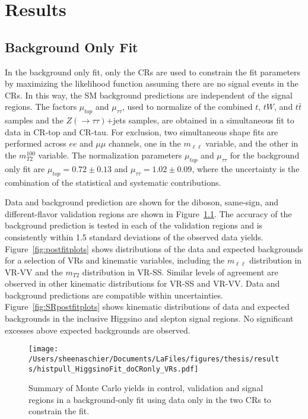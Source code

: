 \chapter{Results}
\label{ch:results}
\section{Background Only Fit}
In the background only fit, only the CRs are used to constrain the fit parameters by maximizing the likelihood function assuming there are no signal events in the CRs.  In this way, the SM background predictions are independent of the signal regions.  The factors $\mu_{top}$ and $\mu_{\tau\tau}$, used to normalize of the combined $t$, $tW$, and  $t\bar{t}$ samples and the  $Z(\rightarrow\tau\tau)$+jets samples, are obtained in a simultaneous fit to data in CR-top and CR-tau.  For exclusion, two simultaneous shape fits are performed across $ee$ and $\mu\mu$ channels, one in the $m_{\ell\ell}$ variable, and the other in the $m_{T2}^{100}$ variable.   The normalization parameters $\mu_{top}$ and $\mu_{\tau\tau}$ for the background only fit are $\mu_{top} = 0.72\pm0.13$ and $\mu_{\tau\tau} = 1.02\pm0.09$, where the uncertainty is the combination of the statistical and systematic contributions.

Data and background prediction are shown for the diboson, same-sign, and different-flavor validation regions are shown in Figure~\ref{fig:pull_plot_summary_yields}.  The accuracy of the background prediction is tested in each of the validation regions and is consistently within 1.5 standard deviations of the observed data yields.  Figure~\ref{fig:postfitplots} shows distributions of the data and expected backgrounds for a selection of VRs and kinematic variables, including the $m_{\ell\ell}$ distribution in VR-VV and the $m_{T2}$ distribution in VR-SS.  Similar levels of agreement are observed in other kinematic distributions for VR-SS and VR-VV.  Data and background predictions are compatible within uncertainties.  Figure~\ref{fig:SRpostfitplots} shows kinematic distributions of data and expected backgrounds in the inclusive Higgsino and slepton signal regions.  No significant excesses above expected backgrounds are observed.


\begin{figure}
 \centering
\texttt{[image: /Users/sheenaschier/Documents/LaFiles/figures/thesis/results/histpull\_HiggsinoFit\_doCRonly\_VRs.pdf]}
   \caption{Summary of Monte Carlo yields in control, validation and signal regions in a background-only fit using data only in the two CRs to constrain the fit.}
  \label{fig:pull_plot_summary_yields}
 \end{figure}

